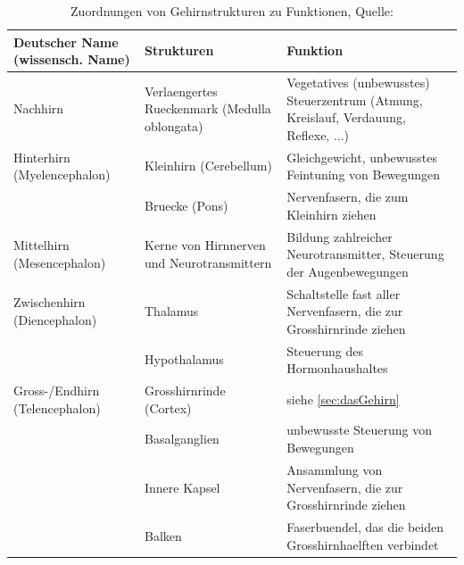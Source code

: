 \begin{table}[!h]
\caption{Zuordnungen von Gehirnstrukturen zu Funktionen, Quelle: \cite{Schaefers.2014}}
\label{Tabelle1}
\begin{tabularx}{\textwidth}{XXX}
\hline\hline

\textbf{Deutscher Name} \newline\textbf{(wissensch. Name)}\newline              & \textbf{Strukturen}                                    & \textbf{Funktion}                                                                             \\ \hline
Nachhirn                                      & Verlaengertes Rueckenmark (Medulla oblongata) & Vegetatives (unbewusstes) Steuerzentrum (Atmung, Kreislauf, Verdauung, Reflexe, ...) \\ \hline
Hinterhirn \newline(Myelencephalon)               & Kleinhirn (Cerebellum)                        & Gleichgewicht, unbewusstes Feintuning von Bewegungen                                 \\ \cline{2-3} 
                                          & Bruecke (Pons)                                & Nervenfasern, die zum Kleinhirn ziehen                                               \\ \hline
Mittelhirn \newline(Mesencephalon)                    & Kerne von Hirnnerven und Neurotransmittern    & Bildung zahlreicher Neurotransmitter, Steuerung der Augenbewegungen                  \\ \hline
Zwischenhirn \newline(Diencephalon)                   & Thalamus                                      & Schaltstelle fast aller Nervenfasern, die zur Grosshirnrinde ziehen                   \\ \cline{2-3} 
                                              & Hypothalamus                                  & Steuerung des Hormonhaushaltes                                                       \\ \hline
Gross-/Endhirn \newline(Telencephalon)                 & Grosshirnrinde (Cortex)                        & siehe \ref{sec:dasGehirn}                                                                            \\ \cline{2-3} 
                                              & Basalganglien                                 & unbewusste Steuerung von Bewegungen                                                  \\ \cline{2-3} 
                                              & Innere Kapsel                                 & Ansammlung von Nervenfasern, die zur Grosshirnrinde ziehen                            \\ \cline{2-3} 
                                              & Balken                                        & Faserbuendel, das die beiden Grosshirnhaelften verbindet                              \\ \hline\hline
\end{tabularx}
\end{table}

